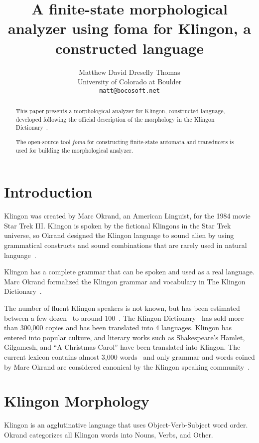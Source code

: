 \documentclass[11pt]{article}
\title{A finite-state morphological analyzer using foma for Klingon, a constructed language}
\author{Matthew David Dreselly Thomas \\
  University of Colorado at Boulder \\
  {\tt matt@bocosoft.net} \\}
\date{}
\begin{document}
\maketitle
\begin{abstract}
This paper presents a morphological analyzer for Klingon, constructed language, developed following the official description of the morphology in the Klingon Dictionary~\cite{Okrand:92}.

The open-source tool \textit{foma} for constructing finite-state automata and transducers is used for building the morphological analyzer.

\end{abstract}

\section{Introduction}

Klingon was created by Marc Okrand, an American Linguist, for the 1984 movie Star Trek III. Klingon is spoken by the fictional Klingons in the Star Trek universe, so Okrand designed the Klingon language to sound alien by using grammatical constructs and sound combinations that are rarely used in natural language~\cite{KLI:Development,KLI:Sounds}.

Klingon has a complete grammar that can be spoken and used as a real language. Marc Okrand formalized the Klingon grammar and vocabulary in The Klingon Dictionary~\cite{Okrand:92}.

The number of fluent Klingon speakers is not known, but has been estimated between a few dozen~\cite{Okrent:09} to around 100~\cite{Kelly:13}. The Klingon Dictionary~\cite{Okrand:92} has sold more than 300,000 copies and has been translated into 4 languages. Klingon has entered into popular culture, and literary works such as Shakespeare's Hamlet, Gilgamesh, and ``A Christmas Carol'' have been translated into Klingon. The current lexicon contains almost 3,000 words~\cite{Zrajm:12} and only grammar and words coined by Marc Okrand are considered canonical by the Klingon speaking community~\cite{KLI:Canonical}.

\section{Klingon Morphology}

Klingon is an agglutinative language that uses Object-Verb-Subject word order. Okrand categorizes all Klingon words into Nouns, Verbs, and Other.
\end{document}
